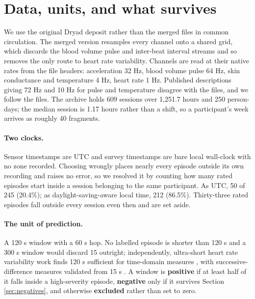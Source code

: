 \documentclass{article}
\begin{document}
\section{Data, units, and what survives}
\label{sec:data}

We use the original Dryad deposit rather than the merged files in common
circulation. The merged version resamples every channel onto a shared grid,
which discards the blood volume pulse and inter-beat interval streams and so
removes the only route to heart rate variability. Channels are read at their
native rates from the file headers: acceleration 32 Hz, blood volume pulse
64 Hz, skin conductance and temperature 4 Hz, heart rate 1 Hz. Published
descriptions giving 72 Hz and 10 Hz for pulse and temperature disagree with the
files, and we follow the files. The archive holds 609 sessions over 1{,}251.7
hours and 250 person-days; the median session is 1.17 hours rather than a
shift, so a participant's week arrives as roughly 40 fragments.

\paragraph{Two clocks.} Sensor timestamps are UTC and survey timestamps are
bare local wall-clock with no zone recorded. Choosing wrongly places nearly
every episode outside its own recording and raises no error, so we resolved it
by counting how many rated episodes start inside a session belonging to the
same participant. As UTC, 50 of 245 (20.4\%); as daylight-saving-aware local
time, 212 (86.5\%). Thirty-three rated episodes fall outside every session even
then and are set aside.

\paragraph{The unit of prediction.} A 120 s window with a 60 s hop. No labelled
episode is shorter than 120 s and a 300 s window would discard 15 outright;
independently, ultra-short heart rate variability work finds 120 s sufficient
for time-domain measures \cite{munoz2015}, with successive-difference measures
validated from 15 s \cite{orini2023}. A window is \textbf{positive} if at least
half of it falls inside a high-severity episode, \textbf{negative} only if it
survives Section \ref{sec:negatives}, and otherwise \textbf{excluded} rather
than set to zero.
\end{document}
